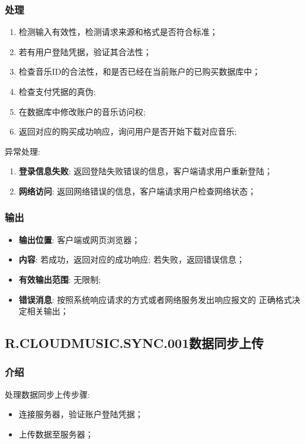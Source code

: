 \subsubsection{处理}
	\begin{enumerate}
		\item 检测输入有效性，检测请求来源和格式是否符合标准；
		\item 若有用户登陆凭据，验证其合法性；
		\item 检查音乐ID的合法性，和是否已经在当前账户的已购买数据库中；
		\item 检查支付凭据的真伪;
		\item 在数据库中修改账户的音乐访问权;
		\item 返回对应的购买成功响应，询问用户是否开始下载对应音乐;
	\end{enumerate}
	\noindent 异常处理: 
	\begin{enumerate}
		\item \textbf{登录信息失败}: 返回登陆失败错误的信息，客户端请求用户重新登陆；
		\item \textbf{网络访问}: 返回网络错误的信息，客户端请求用户检查网络状态；
	\end{enumerate}
\subsubsection{输出}
\begin{itemize}
	\item \textbf{输出位置}: 客户端或网页浏览器；
	\item \textbf{内容}: 若成功，返回对应的成功响应; 若失败，返回错误信息；
	\item \textbf{有效输出范围}: 无限制;
	\item \textbf{错误消息}: 按照系统响应请求的方式或者网络服务发出响应报文的
		正确格式决定相关输出；
\end{itemize}
\subsection{R.CLOUDMUSIC.SYNC.001数据同步上传}
\subsubsection{介绍}
	处理数据同步上传步骤:
	\begin{itemize}
		\item 连接服务器，验证账户登陆凭据；
		\item 上传数据至服务器；
	\end{itemize}
